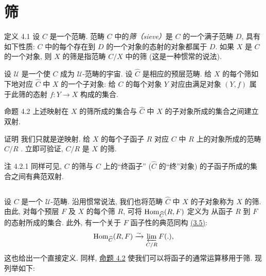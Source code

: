 \section{筛}

\begin{enonce*}{定义 4.1}
设 $C$ 是一个范畴.
范畴 $C$ 中的\emph{筛（sieve）}是 $C$ 的一个满子范畴 $D$,
具有如下性质: $C$ 中的每个存在到 $D$ 的一个对象的态射的对象都属于 $D$.
如果 $X$ 是 $C$ 的一个对象,
则 $X$ 的筛是指范畴 $C/X$ 中的筛 (这是一种惯常的说法).
\end{enonce*}

设 $𝒰$ 是一个使 $C$ 成为 $𝒰$-范畴的宇宙.
设 $\widehat{C}$ 是相应的预层范畴.
给 $X$ 的每个筛如下地对应 $\widehat{C}$ 中 $X$ 的一个子对象:
给 $C$ 的每个对象 $Y$ 对应由满足对象 $(Y,f)$ 属于此筛的态射
$f:Y\rightarrow X$ 构成的集合.

\begin{enonce*}{命题 4.2}
上述映射在 %
$X$ 的筛所成的集合与 $\widehat{C}$ 中 $X$ 的子对象所成的集合之间建立双射.
\end{enonce*}

\begin{enonce*}[remark]{证明}
我们只就是逆映射.
给 $X$ 的每个子函子 $R$ 对应 $C$ 中 $R$ 上的对象所成的范畴 $C/R$
.
立即可验证, $C/R$ 是 $X$ 的筛.
\end{enonce*}

\begin{enonce*}[remark]{注 4.2.1}
同样\pageoriginale{}可见, $C$ 的筛与 $C$ 上的“终函子”
($\widehat{C}$ 的“终”对象) 的子函子所成的集合之间有典范双射.
\end{enonce*}

\setcounter{subsection}{2}
\subsection{}
设 $C$ 是一个 $𝒰$-范畴.
沿用惯常说法, 我们也将范畴 $\widehat{C}$ 中 $X$ 的子对象称为 $X$ 的筛.
由此, 对每个预层 $F$ 及 $X$ 的每个筛 $R$,
可将 $\operatorname{Hom}_{\widehat{C}}(R,F)$ 定义为 %
从函子 $R$ 到 $F$ 的态射所成的集合.
此外, 有一个关于 $F$ 函子性的典范同构 \hyperref[I.cor3.5]{(3.5)}:
$$
\operatorname{Hom}_{\widehat{C}}(R,F)\xrightarrow{\sim}\varprojlim_{C/R}
F(.){},
$$
这也给出一个直接定义.
同样, \hyperref[I.prop4.2]{命题 4.2} 使我们可以将函子的通常运算移用于筛.
现列举如下:

